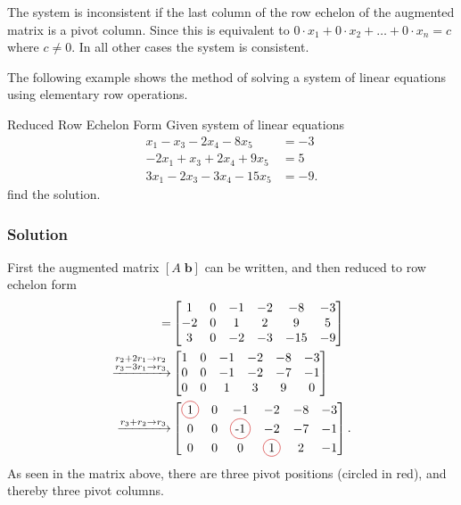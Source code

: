 The system is inconsistent if the last column of the row echelon of the augmented matrix is a pivot column. Since this is equivalent to $0\cdot x_1+0\cdot x_2+\hdots + 0\cdot x_n=c$ where $c\neq 0$. In all other cases the system is consistent.

The following example shows the method of solving a system of linear equations using elementary row operations.
\begin{example}{Reduced Row Echelon Form}
Given system of linear equations
\begin{align*}
    x_1-x_3-2x_4-8x_5&=-3\\
    -2x_1+x_3+2x_4+9x_5 &= 5\\
    3x_1-2x_3-3x_4-15x_5&=-9.
\end{align*}
find the solution.
\subsubsection{Solution}
First the augmented matrix $[A\;\textbf{b}]$ can be written, and then reduced to row echelon form
\begin{align*}
[A\;\textbf{b}] =
	&\begin{bmatrix}
	1  & 0  & -1  &-2  & -8  & -3 \\
	-2 & 0  & 1   & 2  & 9   & 5 \\
	3  & 0  & -2  & -3 & -15 & -9 
   \end{bmatrix} \\
  \xrightarrow{\substack{r_2+2r_1\rightarrow r_2\\  r_3-3r_1\rightarrow r_3}}
  &\begin{bmatrix}
 	 1 & 0 & -1 &-2  & -8 & -3 \\
 	 0 & 0 & -1 & -2 & -7 & -1 \\
	 0 & 0 & 1  & 3  & 9  & 0
  \end{bmatrix}\\
  \xrightarrow{r_3+r_2\rightarrow r_3}
    &\begin{bmatrix}
  	 \circled{1} & 0 & -1 &-2 & -8 & -3 \\
 	 0 & 0 & \circled{-1} & -2 & -7 & -1 \\
	 0 & 0 & 0 & \circled{1} & 2 & -1
       \end{bmatrix}.
\label{examplepivot}
\end{align*}
As seen in the matrix above, there are three pivot positions (circled in red), and thereby three pivot columns.


\end{example}
